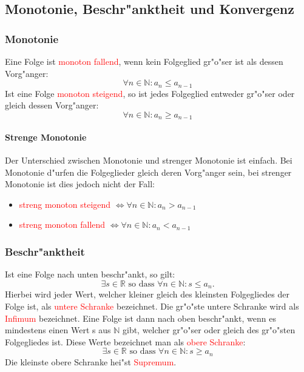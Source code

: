 \subsection{Monotonie, Beschr"anktheit und Konvergenz}
\subsubsection{Monotonie}
Eine Folge ist \textcolor{red}{monoton fallend}, wenn kein Folgeglied gr"o"ser ist als dessen Vorg"anger:
\begin{equation*}
\forall n \in \mathbb{N} : a_n \leq a_{n-1}
\end{equation*}
Ist eine Folge \textcolor{red}{monoton steigend}, so ist jedes Folgeglied entweder gr"o"ser oder gleich dessen Vorg"anger:
\begin{equation*}
\forall n\in{\mathbb{N}}: a_n \geq a_{n-1}
\end{equation*}

\paragraph{Strenge Monotonie} 
Der Unterschied zwischen Monotonie und strenger Monotonie ist einfach. Bei Monotonie d"urfen die Folgeglieder gleich deren Vorg"anger sein, bei strenger Monotonie ist dies jedoch nicht der Fall:
\begin{itemize}
\item \textcolor{red}{streng monoton steigend} $\Leftrightarrow \forall n\in\mathbb{N}: a_n > a_{n-1}$
\item \textcolor{red}{streng monoton fallend} $\Leftrightarrow \forall n\in\mathbb{N}: a_n < a_{n-1}$
\end{itemize}

\subsubsection{Beschr"anktheit}
Ist eine Folge nach unten beschr"ankt, so gilt:
\begin{equation*}
\exists s \in \mathbb{R} \text{ so dass } \forall n \in \mathbb{N}: s \leq a_n.
\end{equation*}
Hierbei wird jeder Wert, welcher kleiner gleich des kleinsten Folgegliedes der Folge ist, als \textcolor{red}{untere Schranke} bezeichnet. Die gr"o"ste untere Schranke wird als \textcolor{red}{Infimum} bezeichnet. Eine Folge ist dann nach oben beschr"ankt, wenn es mindestens einen Wert s aus $\mathbb{N}$ gibt, welcher gr"o"ser oder gleich des gr"o"sten Folgegliedes ist. Diese Werte bezeichnet man als \textcolor{red}{obere Schranke}:
\begin{equation*}
\exists s \in \mathbb{R} \text{ so dass } \forall n \in \mathbb{N} : s\geq a_n 
\end{equation*}
Die kleinste obere Schranke hei"st \textcolor{red}{Supremum}.

